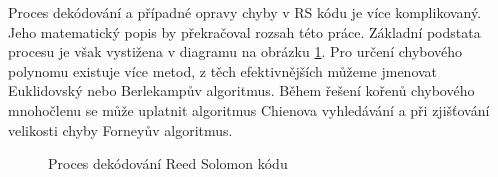 Proces dekódování a případné opravy chyby v RS kódu je více komplikovaný. Jeho
matematický popis by překračoval rozsah této práce. Základní
podstata procesu je však vystižena v diagramu na obrázku
\ref{ReedSolomonDecodingProcess}. Pro určení chybového polynomu existuje více metod, z těch efektivnějších můžeme jmenovat Euklidovský nebo Berlekampův algoritmus. 
Během řešení kořenů chybového mnohočlenu se může uplatnit algoritmus Chienova 
vyhledávání a při zjišťování velikosti chyby Forneyův algoritmus.
\cite{decodingRSCodesLiterature}

\begin{figure}[H]
  \begin{center}
    \caption{Proces dekódování Reed Solomon kódu}
    \label{ReedSolomonDecodingProcess}
  \end{center}
\end{figure}

